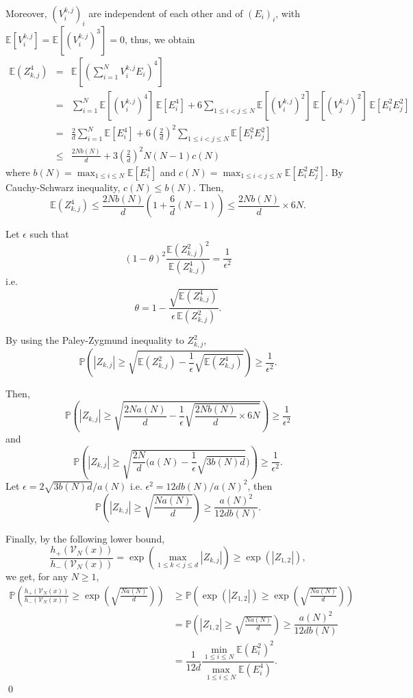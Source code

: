\documentclass[paper=a4, fontsize=11pt]{scrartcl}
\newcommand{\PP}{\mathbb{P}}
\newcommand{\EE}{\mathbb{E}}
\begin{document}
Moreover, $(V_i^{k,j})_i$ are independent of each other and of $(E_i)_i$, with $\mathbb{E}[V_i^{k,j}] = \mathbb{E}[(V_i^{k,j})^3] = 0$, thus, we obtain
\begin{eqnarray*}
 \mathbb{E}(Z_{k,j}^4) &=& \mathbb{E} \left[ \left( \sum_{i=1}^N V_i^{k,j} E_i \right)^4 \right]
\\ &=& \sum_{i=1}^N \mathbb{E}\left[ \left(V_i^{k,j}\right)^4 \right]\, \mathbb{E}[E_i^4]
+ 6 \sum_{1 \leq i < j \leq N} \mathbb{E}\left[ \left(V_i^{k,j}\right)^2 \right]\, \mathbb{E}\left[ \left(V_j^{k,j}\right)^2 \right]\, \mathbb{E}[E_i^2 E_j^2] \\ &=&   \frac{2}{d} \sum_{i=1}^N \mathbb{E}[E_i^4]
+ 6 \left(\frac{2}{d}\right)^2 \sum_{1 \leq i < j \leq N} \mathbb{E}[E_i^2 E_j^2] \\ &\leq& \frac{2Nb(N)}{d} +   3 \left(\frac{2}{d}\right)^2 N(N-1) c(N)
\end{eqnarray*}
where $b(N) = \max_{1 \leq i \leq N} \mathbb{E}[E_i^4] $ and $c(N) = \max_{1 \leq i < j \leq N} \mathbb{E}[E_i^2 E_j^2]$. By Cauchy-Schwarz inequality, $c(N) \leq b(N).$ Then, $$ \mathbb{E}(Z_{k,j}^4) \leq \frac{2Nb(N)}{d} \left( 1 + \frac{6}{d} (N-1) \right) \leq \frac{2Nb(N)}{d}  \times 6N.$$

Let $\epsilon $ such that $$(1-\theta)^2 \frac{\mathbb{E}(Z_{k,j}^2)^2}{\mathbb{E}(Z_{k,j}^4)} = \frac{1}{\epsilon^2}$$ i.e. $$\theta = 1 - \frac{\sqrt{\mathbb{E}(Z_{k,j}^4)}}{\epsilon \, \mathbb{E}(Z_{k,j}^2) }.$$

By using the Paley-Zygmund inequality to $Z_{k,j}^2$, 
\[
\PP\left(|Z_{k,j}| \geq  \sqrt{\mathbb{E}(Z_{k,j}^2) - \frac{1}{\epsilon } {\sqrt{\mathbb{E}(Z_{k,j}^4)}}} \right) \geq \frac{1}{\epsilon^2}.
\]

Then, 
\[
\PP\left(|Z_{k,j}| \geq  \sqrt{\frac{2Na(N)}{d} - \frac{1}{\epsilon } {\sqrt{\frac{2Nb(N)}{d}  \times 6N}} }\right) \geq \frac{1}{\epsilon^2}
\]
and \[
\PP\left(|Z_{k,j}| \geq  \sqrt{\frac{2N}{d} ({a(N)} - \frac{1}{\epsilon } {\sqrt{3b(N)d}}} ) \right) \geq \frac{1}{\epsilon^2}.
\]
Let $\epsilon = 2\sqrt{3b(N)d}/a(N)$ i.e. $\epsilon^2 = 12d b(N)/a(N)^2$, then
 \[
\PP\left(|Z_{k,j}| \geq  \sqrt{\frac{Na(N)}{d} } \right) \geq \dfrac{a(N)^2}{12d b(N)}.
\]

Finally, by the following lower bound,
\[
\frac{h_+(\mathcal V_N (x) )}{h_-(\mathcal V_N (x) )} = \exp \left( \max_{1\leq k < j \leq d } |Z_{k,j}| \right) \geq \exp (|Z_{1,2}|),
\]
we get, for any $N \geq 1$, 
\begin{align*}
\PP\left(\frac{h_+(\mathcal V_N (x) )}{h_-(\mathcal V_N (x) )} 
\geq \exp\left(\sqrt{\frac{Na(N)}{d}}\right)\right) &\geq \PP\left(\exp(|Z_{1,2}|) \geq \exp\left(\sqrt{\frac{Na(N)}{d}}\right)\right) \\ 
&= \PP\left(|Z_{1,2}| \geq \sqrt{\frac{Na(N)}{d}}\right) \geq  \dfrac{a(N)^2}{12d b(N)} \\ &= \dfrac{1}{12d} \dfrac{\min_{1 \leq i \leq N} \EE(E_i^2)^2}{\max_{1 \leq i \leq N} \mathbb{E}(E_i^4) }.    
\end{align*} \qed
\end{document}
